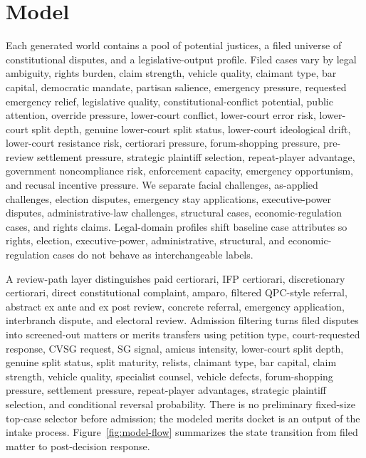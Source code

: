\documentclass[
    journal=jlc,
    manuscript=research-article,
    year=2026,
  ]{cup-journal}
\begin{document}
\section{Model}

Each generated world contains a pool of potential justices, a filed universe of constitutional disputes, and a legislative-output profile. Filed cases vary by legal ambiguity, rights burden, claim strength, vehicle quality, claimant type, bar capital, democratic mandate, partisan salience, emergency pressure, requested emergency relief, legislative quality, constitutional-conflict potential, public attention, override pressure, lower-court conflict, lower-court error risk, lower-court split depth, genuine lower-court split status, lower-court ideological drift, lower-court resistance risk, certiorari pressure, forum-shopping pressure, pre-review settlement pressure, strategic plaintiff selection, repeat-player advantage, government noncompliance risk, enforcement capacity, emergency opportunism, and recusal incentive pressure. We separate facial challenges, as-applied challenges, election disputes, emergency stay applications, executive-power disputes, administrative-law challenges, structural cases, economic-regulation cases, and rights claims. Legal-domain profiles shift baseline case attributes so rights, election, executive-power, administrative, structural, and economic-regulation cases do not behave as interchangeable labels.

A review-path layer distinguishes paid certiorari, IFP certiorari, discretionary certiorari, direct constitutional complaint, amparo, filtered QPC-style referral, abstract ex ante and ex post review, concrete referral, emergency application, interbranch dispute, and electoral review. Admission filtering turns filed disputes into screened-out matters or merits transfers using petition type, court-requested response, CVSG request, SG signal, amicus intensity, lower-court split depth, genuine split status, split maturity, relists, claimant type, bar capital, claim strength, vehicle quality, specialist counsel, vehicle defects, forum-shopping pressure, settlement pressure, repeat-player advantages, strategic plaintiff selection, and conditional reversal probability. There is no preliminary fixed-size top-case selector before admission; the modeled merits docket is an output of the intake process. Figure~\ref{fig:model-flow} summarizes the state transition from filed matter to post-decision response.
\end{document}
